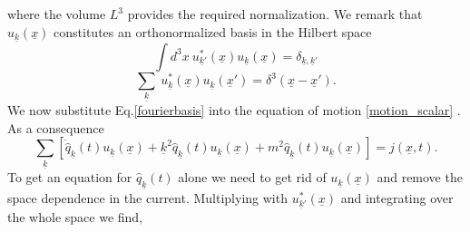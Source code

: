 \documentclass[12pt, titlepage]{article}
\begin{document}
where the volume $ L^{3} $ provides the required normalization. We remark that $ u_{\underline{k}}(\underline{x}) $ constitutes an orthonormalized basis in the Hilbert space
\begin{equation}\label{ortho_relation}
\int d^{3}x \ 
u^{\ast}_{\underline{k}'}(\underline{x})
u_{\underline{k}}(\underline{x})
=
\delta_{\underline{k}, \underline{k}'}
\end{equation}
\begin{equation}\label{completness_relation}
\sum_{\underline{k}} \ 
u^{\ast}_{\underline{k}}(\underline{x})
u_{\underline{k}}(\underline{x}')
=
\delta^{3}\left(\underline{x}-\underline{x}'\right)
.
\end{equation}
We now substitute Eq.\enskip\eqref{fourierbasis} into the equation of motion \eqref{motion_scalar}
. As a consequence  
\begin{equation}
 \sum_{\underline{k}}
 \left[ 
	\ddot{\hat{q}}_{\underline{k}}(t)u_{\underline{k}}(\underline{x})
	+\underline{k}^{2}\hat{q}_{\underline{k}}(t)u_{\underline{k}}(\underline{x})
	+m^{2}\hat{q}_{\underline{k}}(t)u_{\underline{k}}(\underline{x})
 \right] 
  =j(\underline{x},t).
\end{equation}
To get an equation for $ \hat{q}_{\underline{k}}(t) $ alone we need to get rid of $ u_{\underline{k}}(\underline{x}) $ and remove the space dependence in the current. Multiplying with $ u^{\ast}_{\underline{k}'}(\underline{x}) $ and integrating over the whole space we find,
\end{document}
